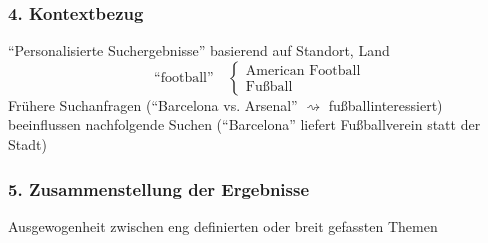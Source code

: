 \subsubsection*{4. Kontextbezug}
``Personalisierte Suchergebnisse'' basierend auf Standort, Land
\[ \text{``football''} \quad
  \begin{cases}
    \text{American Football} \\
    \text{Fußball}
  \end{cases}
\]
Frühere Suchanfragen (``Barcelona vs. Arsenal'' $\rightsquigarrow$
fußballinteressiert) beeinflussen nachfolgende Suchen (``Barcelona'' liefert
Fußballverein statt der Stadt)

\subsubsection*{5. Zusammenstellung der Ergebnisse}
Ausgewogenheit zwischen eng definierten oder breit gefassten Themen